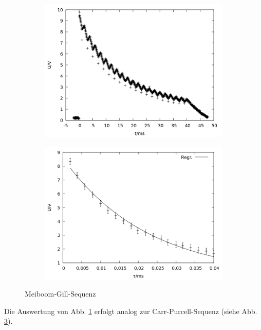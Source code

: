 \begin{figure}[h]
  \begin{subfigure}[h]{0.5\textwidth}
    \centering
    \includegraphics[width=\linewidth]{data/p402_443_data/meiboom_gill_sequenz/plot_159.png}
    \label{fig:gill_raw}
  \end{subfigure}%
  \begin{subfigure}[h]{0.5\textwidth}
    \centering
    \includegraphics[width=\linewidth]{data/p402_443_data/meiboom_gill_sequenz/out_gill.png}
    \label{fig:gill}
  \end{subfigure}
  \caption{Meiboom-Gill-Sequenz}
\end{figure}
Die Auswertung von Abb. \ref{fig:gill_raw} erfolgt analog zur Carr-Purcell-Sequenz (siehe Abb. \ref{fig:gill}).

